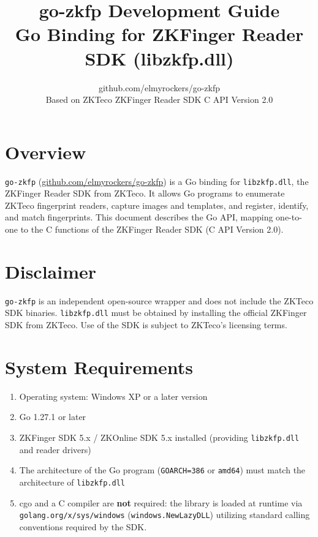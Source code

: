 \documentclass[11pt, a4paper]{article}
\title{\textbf{go-zkfp Development Guide}\\Go Binding for ZKFinger Reader SDK (libzkfp.dll)}
\author{github.com/elmyrockers/go-zkfp \\ Based on ZKTeco ZKFinger Reader SDK C API Version 2.0}
\date{}
\begin{document}
\maketitle
\tableofcontents
\newpage

\section{Overview}
\texttt{go-zkfp} (\url{github.com/elmyrockers/go-zkfp}) is a Go binding for \texttt{libzkfp.dll}, the ZKFinger Reader SDK from ZKTeco. It allows Go programs to enumerate ZKTeco fingerprint readers, capture images and templates, and register, identify, and match fingerprints. This document describes the Go API, mapping one-to-one to the C functions of the ZKFinger Reader SDK (C API Version 2.0).

\section{Disclaimer}
\texttt{go-zkfp} is an independent open-source wrapper and does not include the ZKTeco SDK binaries. \texttt{libzkfp.dll} must be obtained by installing the official ZKFinger SDK from ZKTeco. Use of the SDK is subject to ZKTeco's licensing terms.

\section{System Requirements}
\begin{enumerate}
    \item Operating system: Windows XP or a later version
    \item Go 1.27.1 or later
    \item ZKFinger SDK 5.x / ZKOnline SDK 5.x installed (providing \texttt{libzkfp.dll} and reader drivers)
    \item The architecture of the Go program (\texttt{GOARCH=386} or \texttt{amd64}) must match the architecture of \texttt{libzkfp.dll}
    \item cgo and a C compiler are \textbf{not} required: the library is loaded at runtime via \texttt{golang.org/x/sys/windows} (\texttt{windows.NewLazyDLL}) utilizing standard calling conventions required by the SDK.
\end{enumerate}
\end{document}
